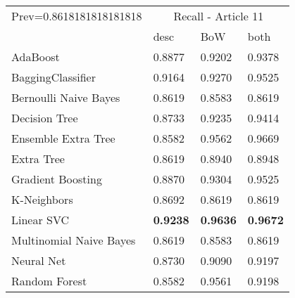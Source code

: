 \begin{tabular}{|l|l|l|l| }
\hline
Prev=0.8618181818181818 &  \multicolumn{3}{c|}{Recall - Article 11} \\
\cline{2-4} & desc & BoW & both \\ \hline
AdaBoost                & 0.8877 & 0.9202 & 0.9378\\
BaggingClassifier       & 0.9164 & 0.9270 & 0.9525\\
Bernoulli Naive Bayes   & 0.8619 & 0.8583 & 0.8619\\
Decision Tree           & 0.8733 & 0.9235 & 0.9414\\
Ensemble Extra Tree     & 0.8582 & 0.9562 & 0.9669\\
Extra Tree              & 0.8619 & 0.8940 & 0.8948\\
Gradient Boosting       & 0.8870 & 0.9304 & 0.9525\\
K-Neighbors             & 0.8692 & 0.8619 & 0.8619\\
Linear SVC              & {\bf 0.9238} & {\bf 0.9636} & {\bf 0.9672}\\
Multinomial Naive Bayes & 0.8619 & 0.8583 & 0.8619\\
Neural Net              & 0.8730 & 0.9090 & 0.9197\\
Random Forest           & 0.8582 & 0.9561 & 0.9198\\
\hline
\end{tabular}